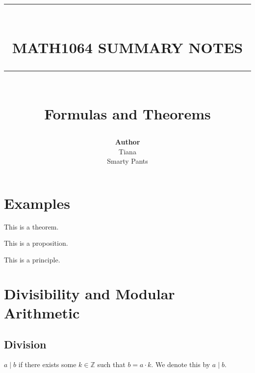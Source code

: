 \documentclass{article}
\newcommand{\HRule}[1]{\rule{\linewidth}{#1}}
\begin{document}

\title{ \normalsize \textsc{}
		\\ [2.0cm]
		\HRule{1.5pt} \\
		\LARGE \textbf{\uppercase{Math1064 Summary Notes}}
		\HRule{2.0pt} \\ [0.6cm] \LARGE{Formulas and Theorems} \vspace*{10\baselineskip}}
\date{}
\author{\textbf{Author} \\ 
		Tiana \\
		Smarty Pants}

\maketitle
\newpage

\tableofcontents
\newpage


\section{Examples}

\begin{theorem}
    This is a theorem.
\end{theorem}

\begin{proposition}
    This is a proposition.
\end{proposition}

\begin{principle}
    This is a principle.
\end{principle}

\newpage
\section{Divisibility and Modular Arithmetic}
\subsection{Division}
\begin{principle}
    \( a \mid b \) if there exists some \( k \in \mathbb{Z} \) such that \( b = a \cdot k \). 
    We denote this by \( a \mid b \).
\end{principle}
\end{document}
